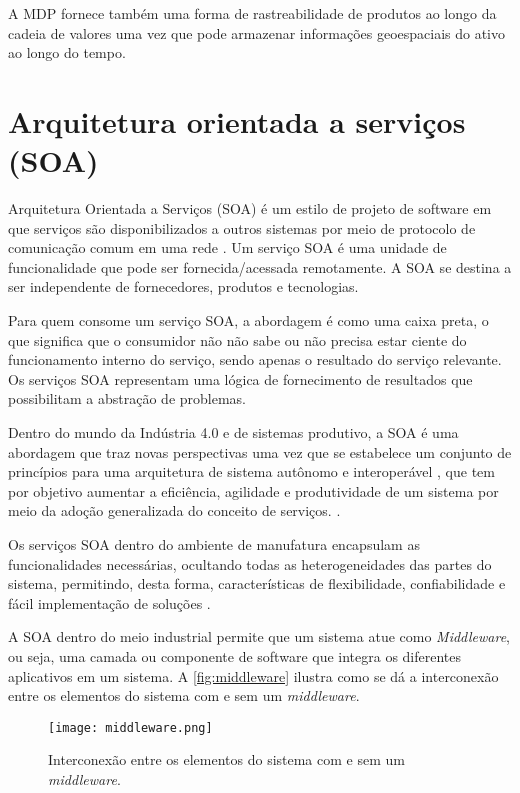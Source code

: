 	A MDP fornece também uma forma de rastreabilidade de produtos ao longo da cadeia de valores uma vez que pode armazenar informações geoespaciais do ativo ao longo do tempo.

\section{Arquitetura orientada a serviços (SOA)}
	
	Arquitetura Orientada a Serviços (SOA) é um estilo de projeto de software em que serviços são disponibilizados a outros sistemas por meio de protocolo de comunicação comum em uma rede \cite{bell2008soa}. Um serviço SOA é uma unidade de funcionalidade que pode ser fornecida/acessada remotamente. A SOA se destina a ser independente de fornecedores, produtos e tecnologias.
	
	Para quem consome um serviço SOA, a abordagem é como uma caixa preta, o que significa que o consumidor não não sabe ou não precisa estar ciente do funcionamento interno do serviço, sendo apenas o resultado do serviço relevante. Os serviços SOA representam uma lógica de fornecimento de resultados que possibilitam a abstração de problemas.
	
	Dentro do mundo da Indústria 4.0 e de sistemas produtivo, a SOA é uma abordagem que	traz novas perspectivas uma vez que se estabelece um conjunto de princípios para uma arquitetura de sistema autônomo e interoperável \cite{candido2009soa}, que tem por objetivo aumentar a eficiência, agilidade e produtividade de um sistema por meio da adoção generalizada do conceito de serviços. \cite{souit2013soa}.
	
	Os serviços SOA dentro do ambiente de manufatura encapsulam as funcionalidades necessárias, ocultando todas as heterogeneidades das partes do sistema, permitindo, desta forma, características de flexibilidade, confiabilidade e fácil implementação de	soluções \cite{groba2008soa}.
	
	A SOA dentro do meio industrial permite que um sistema atue como \textit{Middleware}, ou seja, uma camada ou componente de software que integra os diferentes aplicativos em um sistema. A \autoref{fig:middleware} ilustra como se dá a interconexão entre os elementos do sistema com e sem um \textit{middleware}.
	
	\begin{figure}[htb]
		\centering
		\caption{Interconexão entre os elementos do sistema com e sem um \textit{middleware}.}
		\label{fig:middleware}
		\texttt{[image: middleware.png]}
	\end{figure}

